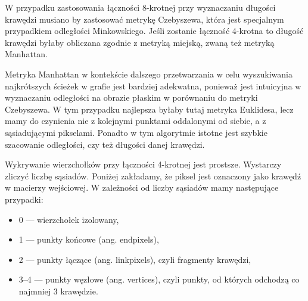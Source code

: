 \documentclass[a4paper,11pt,twoside,openright]{report}
\theoremstyle{definition}
\begin{document}
W przypadku zastosowania łączności 8-krotnej przy wyznaczaniu długości krawędzi
musiano by zastosować metrykę Czebyszewa, która jest specjalnym przypadkiem
odległości Minkowskiego. Jeśli zostanie łączność 4-krotna to długość krawędzi
byłaby obliczana zgodnie z metryką miejską, zwaną też metryką Manhattan.

Metryka Manhattan w kontekście dalszego przetwarzania w celu wyszukiwania
najkrótszych ścieżek w grafie jest bardziej adekwatna, ponieważ jest intuicyjna
w wyznaczaniu odległości na obrazie płaskim w porównaniu do metryki Czebyszewa.
W tym przypadku najlepsza byłaby tutaj metryka Euklidesa, lecz mamy do czynienia
nie z kolejnymi punktami oddalonymi od siebie, a z sąsiadującymi pikselami.
Ponadto w tym algorytmie istotne jest szybkie szacowanie odległości, czy też
długości danej krawędzi.

Wykrywanie wierzchołków przy łączności 4-krotnej jest prostsze. Wystarczy zliczyć
liczbę sąsiadów. Poniżej zakładamy, że piksel jest oznaczony jako krawędź w macierzy
wejściowej. W zależności od liczby sąsiadów mamy następujące przypadki:
\begin{itemize}[noitemsep]
\item 0 --- wierzchołek izolowany,
\item 1 --- punkty końcowe (ang. endpixels),
\item 2 --- punkty łączące (ang. linkpixels), czyli fragmenty krawędzi,
\item 3--4 --- punkty węzłowe (ang. vertices), czyli punkty, od których odchodzą
co najmniej 3 krawędzie.
\end{itemize}
\end{document}
